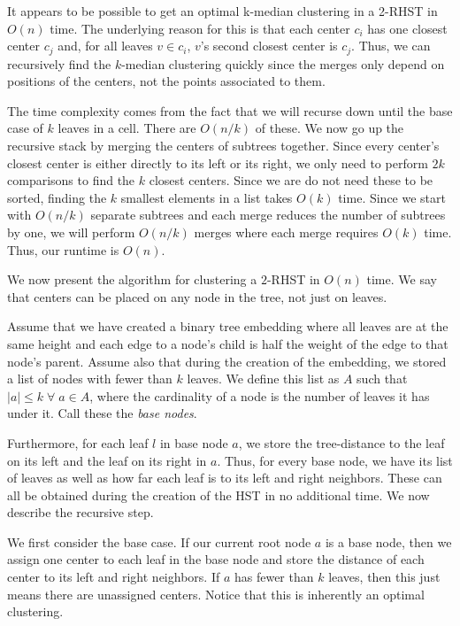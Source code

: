 \documentclass{article}
\theoremstyle{definition}
\begin{document}
\begin{algorithm}
\begin{algorithmic}[1]
\end{algorithmic}
\end{algorithm}

It appears to be possible to get an optimal k-median clustering in a 2-RHST in $O(n)$ time. The underlying reason for this is that each center $c_i$
has one closest center $c_j$ and, for all leaves $v \in c_i$, $v$'s second closest center is $c_j$. Thus, we can recursively find the $k$-median clustering
quickly since the merges only depend on positions of the centers, not the points associated to them.

The time complexity comes from the fact that we will recurse down until the base case of $k$ leaves in a cell. There are $O(n/k)$ of these. We now go up the
recursive stack by merging the centers of subtrees together. Since every center's closest center is either directly to its left or its right, we only need to
perform $2k$ comparisons to find the $k$ closest centers. Since we are do not need these to be sorted, finding the $k$ smallest elements in a list takes $O(k)$
time. Since we start with $O(n/k)$ separate subtrees and each merge reduces the number of subtrees by one, we will perform $O(n/k)$ merges where each merge
requires $O(k)$ time. Thus, our runtime is $O(n)$.

We now present the algorithm for clustering a $2$-RHST in $O(n)$ time. We say that centers can be placed on any node in the tree, not just on leaves.

Assume that we have created a binary tree embedding where all leaves are at the same height and each edge to a node's child is half the weight of the
edge to that node's parent. Assume also that during the creation of the embedding, we stored a list of nodes with fewer than $k$ leaves. We define this
list as $A$ such that $|a| \leq k \; \forall \; a \in A$, where the cardinality of a node is the number of leaves it has under it. Call these the
\emph{base nodes}.

Furthermore, for each leaf $l$ in base node $a$, we store the tree-distance to the leaf on its left and the leaf on its right in $a$.
Thus, for every base node, we have its list of leaves as well as how far each leaf is to its left and right neighbors. These can all be obtained
during the creation of the HST in no additional time. We now describe the recursive step.

We first consider the base case. If our current root node $a$ is a base node, then we assign one center to each leaf in the
base node and store the distance of each center to its left and right neighbors. If $a$ has fewer than $k$ leaves, then this just means there are unassigned
centers. Notice that this is inherently an optimal clustering.
\end{document}
